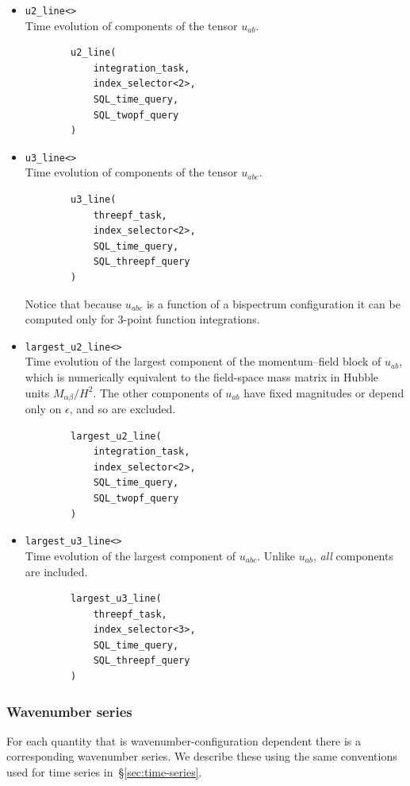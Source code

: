 \documentclass[11pt,a4paper]{article}
\begin{document}
\begin{itemize}
    \item \texttt{u2_line<>} \\
    Time evolution of components of the tensor $u_{ab}$.
    \begin{verbatim}
        u2_line(
            integration_task,
            index_selector<2>,
            SQL_time_query,
            SQL_twopf_query
        )
    \end{verbatim}

    \item \texttt{u3_line<>} \\
    Time evolution of components of the tensor $u_{abc}$.
    \begin{verbatim}
        u3_line(
            threepf_task,
            index_selector<2>,
            SQL_time_query,
            SQL_threepf_query
        )    
    \end{verbatim}
    Notice that because $u_{abc}$ is a function of a bispectrum configuration
    it can be computed only for 3-point function integrations.
    
    \item \texttt{largest_u2_line<>} \\
    Time evolution of the largest component of the momentum--field block
    of $u_{ab}$, which is numerically equivalent to the field-space
    mass matrix in Hubble units $M_{\alpha\beta}/H^2$.
    The other components of $u_{ab}$ have fixed magnitudes or depend only
    on $\epsilon$, and so are excluded.
    \begin{verbatim}
        largest_u2_line(
            integration_task,
            index_selector<2>,
            SQL_time_query,
            SQL_twopf_query
        )
    \end{verbatim}

    \item \texttt{largest_u3_line<>} \\
    Time evolution of the largest component of $u_{abc}$.
    Unlike $u_{ab}$, \emph{all} components are included.
    \begin{verbatim}
        largest_u3_line(
            threepf_task,
            index_selector<3>,
            SQL_time_query,
            SQL_threepf_query
        )    
    \end{verbatim}

\end{itemize}

\subsubsection{Wavenumber series}
\label{sec:wavenumber-series}
For each quantity that is wavenumber-configuration dependent there is a corresponding
wavenumber series.
We describe these using the same conventions used for time series
in~\S\ref{sec:time-series}.
\end{document}
